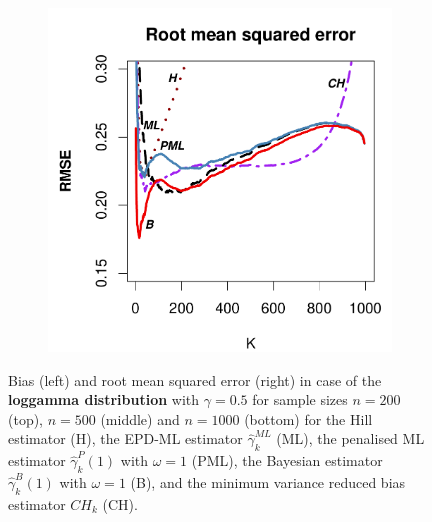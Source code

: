 \begin{figure}[h]
\begin{subfigure}[h]{0.40\linewidth}
		\end{subfigure}
		\hspace{\fill}
		\begin{subfigure}[h]{0.40\linewidth}
			\includegraphics[width=\textwidth]{./plots/paper1/RMSE_Outputloggamma0,51000.pdf}
		\end{subfigure}
		\caption{Bias (left) and root mean squared error (right) in case of the \textbf{loggamma distribution} with $\gamma=0.5$ for sample sizes $n=200$ (top), $n=500$ (middle) and $n=1000$ (bottom) for the Hill estimator (H), the EPD-ML estimator $\hat{\gamma}_{k}^{ML}$ (ML), the penalised ML estimator $\hat{\gamma}^P_{k}(1)$ with $\omega=1$ (PML), the Bayesian estimator $\hat{\gamma}^B_{k}(1)$ with $\omega=1$ (B), and the minimum variance reduced bias estimator $CH_k$ (CH).}
		\label{paper1:fig4}
	\end{figure}

